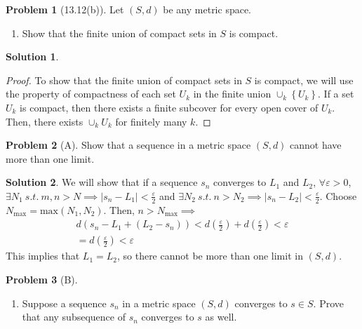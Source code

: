 \documentclass[12pt]{article}
\theoremstyle{definition} %
\newtheorem{solution}{Solution}
\newtheorem{problem}{Problem}
\theoremstyle{plain} %
\begin{document}
\begin{problem}[13.12(b)]   
Let $(S,d)$ be any metric space.
\begin{enumerate}
    \item Show that the finite union of compact sets in $S$ is compact.
\end{enumerate}
\end{problem}

\begin{solution}
   \begin{proof}
    To show that the finite union of compact sets in $S$ is compact, we will use the property of compactness of each set $U_k$ in the finite union $\cup_k \left\{  U_k\right\} $. 
    If a set $U_k$ is compact, then there exists a finite subcover for every open cover of $U_k$. Then, there exists $\cup_k U_k$ for finitely many $k$.
   \end{proof} 
\end{solution}

\begin{problem}[A]
    Show that a sequence in a metric space $(S,d)$ cannot have more than one limit.
\end{problem}

\begin{solution}
   We will show that if a sequence $s_{n} $ converges to $L_{1} $ and $L_{2} $, $\forall \varepsilon >0$, $\exists N_{1}\ s.t. \ m,n >N \implies \left\vert s_{n} -L_{1}   \right\vert <\frac{\varepsilon}{2}$ and $\exists N_{2} \ s.t. \ n>N_{2} \implies \left\vert s_{n} -L_{2}  \right\vert <\frac{\varepsilon}{2}$. Choose $N_{\text{max} }=\text{max}(N_{1},N_{2} )  $. Then, $n>N_{\text{max} } \implies $
   \begin{align}
    d\left( s_{n}  -L_{1}  + (L_{2}-s_{n}) \right)  <  d\left( \frac{\varepsilon}{2} \right)  +  d\left( \frac{\varepsilon}{2} \right)< \varepsilon \\[10pt] 
   =  d\left( \frac{\varepsilon}{2} \right) <\varepsilon 
   \end{align}
   This implies that $L_{1} =L_{2} $, so there cannot be more than one limit in $(S,d)$. 
\end{solution}

\begin{problem}[B]
    \begin{enumerate}
        \item Suppose a sequence $s_{n} $ in a metric space $(S,d)$ converges to $s\in S$. Prove that any subsequence of $s_{n} $ converges to $s$ as well.
    \end{enumerate}
\end{problem}
\end{document}
